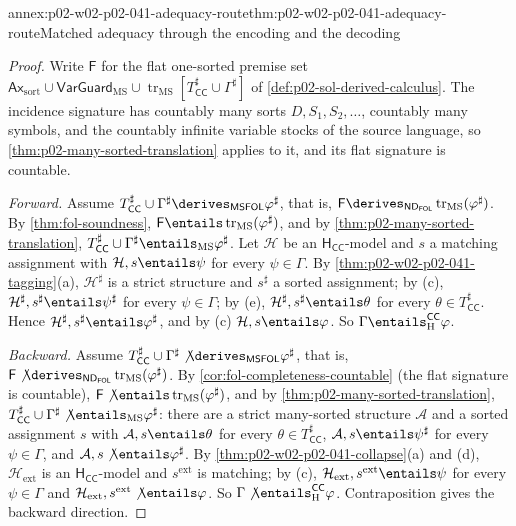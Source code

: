 \begin{annexitem}{annex:p02-w02-p02-041-adequacy-route}{thm:p02-w02-p02-041-adequacy-route}{Matched adequacy through the encoding and the decoding}
\begin{proof}
Write \(\mathsf F\) for the flat one-sorted premise set
\(\mathsf{Ax}_{\mathrm{sort}}\cup\mathsf{VarGuard}_{\mathrm{MS}}\cup
\operatorname{tr}_{\mathrm{MS}}[T_{\mathsf{CC}}^\sharp\cup\Gamma^\sharp]\) of
\cref{def:p02-sol-derived-calculus}.  The incidence signature has countably
many sorts \(D,S_1,S_2,\ldots\), countably many symbols, and the countably
infinite variable stocks of the source language, so
\cref{thm:p02-many-sorted-translation} applies to it, and its flat signature is
countable.

\emph{Forward.}  Assume
\(T_{\mathsf{CC}}^\sharp\cup\Gamma^\sharp\derives_{\mathsf{MSFOL}}\varphi^\sharp\),
that is,
\(\mathsf F\derives_{\mathsf{ND}_{\mathsf{FOL}}}\operatorname{tr}_{\mathrm{MS}}(\varphi^\sharp)\).
By \cref{thm:fol-soundness},
\(\mathsf F\entails\operatorname{tr}_{\mathrm{MS}}(\varphi^\sharp)\), and by
\cref{thm:p02-many-sorted-translation},
\(T_{\mathsf{CC}}^\sharp\cup\Gamma^\sharp\entails_{\mathrm{MS}}\varphi^\sharp\).
Let \(\mathcal H\) be an \(\mathsf H_{\mathsf{CC}}\)-model and \(s\) a
matching assignment with \(\mathcal H,s\entails\psi\) for every
\(\psi\in\Gamma\).  By \cref{thm:p02-w02-p02-041-tagging}(a),
\(\mathcal H^\sharp\) is a strict structure and \(s^\sharp\) a sorted
assignment; by (c), \(\mathcal H^\sharp,s^\sharp\entails\psi^\sharp\) for
every \(\psi\in\Gamma\); by (e), \(\mathcal H^\sharp,s^\sharp\entails\theta\)
for every \(\theta\in T_{\mathsf{CC}}^\sharp\).  Hence
\(\mathcal H^\sharp,s^\sharp\entails\varphi^\sharp\), and by (c)
\(\mathcal H,s\entails\varphi\).  So
\(\Gamma\entails_{\mathrm H}^{\mathsf{CC}}\varphi\).

\emph{Backward.}  Assume
\(T_{\mathsf{CC}}^\sharp\cup\Gamma^\sharp\not\derives_{\mathsf{MSFOL}}\varphi^\sharp\),
that is,
\(\mathsf F\not\derives_{\mathsf{ND}_{\mathsf{FOL}}}\operatorname{tr}_{\mathrm{MS}}(\varphi^\sharp)\).
By \cref{cor:fol-completeness-countable} (the flat signature is countable),
\(\mathsf F\not\entails\operatorname{tr}_{\mathrm{MS}}(\varphi^\sharp)\), and by
\cref{thm:p02-many-sorted-translation},
\(T_{\mathsf{CC}}^\sharp\cup\Gamma^\sharp\not\entails_{\mathrm{MS}}\varphi^\sharp\):
there are a strict many-sorted structure \(\mathcal A\) and a sorted
assignment \(s\) with \(\mathcal A,s\entails\theta\) for every
\(\theta\in T_{\mathsf{CC}}^\sharp\), \(\mathcal A,s\entails\psi^\sharp\) for
every \(\psi\in\Gamma\), and \(\mathcal A,s\not\entails\varphi^\sharp\).  By
\cref{thm:p02-w02-p02-041-collapse}(a) and (d), \(\mathcal H_{\mathrm{ext}}\)
is an \(\mathsf H_{\mathsf{CC}}\)-model and \(s^{\mathrm{ext}}\) is matching;
by (c), \(\mathcal H_{\mathrm{ext}},s^{\mathrm{ext}}\entails\psi\) for every
\(\psi\in\Gamma\) and
\(\mathcal H_{\mathrm{ext}},s^{\mathrm{ext}}\not\entails\varphi\).  So
\(\Gamma\not\entails_{\mathrm H}^{\mathsf{CC}}\varphi\).  Contraposition gives
the backward direction.
\end{proof}
\end{annexitem}

